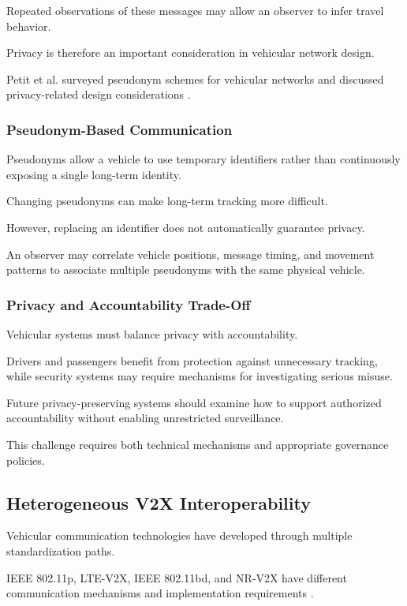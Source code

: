 Repeated observations of these
messages may allow an observer
to infer travel behavior.

Privacy is therefore an important
consideration in vehicular
network design.

Petit et al. surveyed pseudonym
schemes for vehicular networks
and discussed privacy-related
design considerations
\cite{Petit2015}.

\subsubsection{Pseudonym-Based Communication}

Pseudonyms allow a vehicle to use
temporary identifiers rather than
continuously exposing a single
long-term identity.

Changing pseudonyms can make
long-term tracking more difficult.

However, replacing an identifier
does not automatically guarantee
privacy.

An observer may correlate vehicle
positions, message timing, and
movement patterns to associate
multiple pseudonyms with the
same physical vehicle.

\subsubsection{Privacy and Accountability Trade-Off}

Vehicular systems must balance
privacy with accountability.

Drivers and passengers benefit
from protection against unnecessary
tracking, while security systems
may require mechanisms for
investigating serious misuse.

Future privacy-preserving systems
should examine how to support
authorized accountability without
enabling unrestricted surveillance.

This challenge requires both
technical mechanisms and
appropriate governance policies.

\subsection{Heterogeneous V2X Interoperability}

Vehicular communication technologies
have developed through multiple
standardization paths.

IEEE 802.11p, LTE-V2X, IEEE 802.11bd,
and NR-V2X have different
communication mechanisms and
implementation requirements
\cite{MacHardy2018,Naik2019}.

